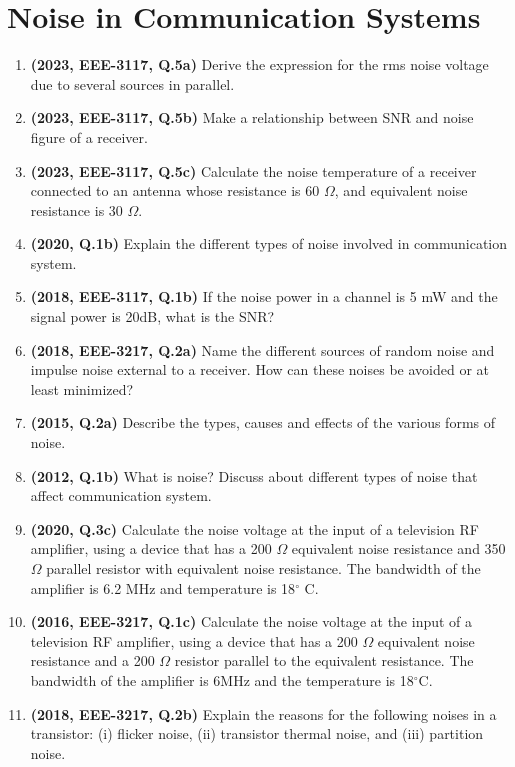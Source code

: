 \documentclass[12pt, a4paper]{article}
\begin{document}
	\section{Noise in Communication Systems}
	\begin{enumerate}
		\item \textbf{(2023, EEE-3117, Q.5a)} Derive the expression for the rms noise voltage due to several sources in parallel.
		\item \textbf{(2023, EEE-3117, Q.5b)} Make a relationship between SNR and noise figure of a receiver.
		\item \textbf{(2023, EEE-3117, Q.5c)} Calculate the noise temperature of a receiver connected to an antenna whose resistance is 60 $\Omega$, and equivalent noise resistance is 30 $\Omega$.
		\item \textbf{(2020, Q.1b)} Explain the different types of noise involved in communication system.
		\item \textbf{(2018, EEE-3117, Q.1b)} If the noise power in a channel is 5 mW and the signal power is 20dB, what is the SNR?
		\item \textbf{(2018, EEE-3217, Q.2a)} Name the different sources of random noise and impulse noise external to a receiver. How can these noises be avoided or at least minimized?
		\item \textbf{(2015, Q.2a)} Describe the types, causes and effects of the various forms of noise.
		\item \textbf{(2012, Q.1b)} What is noise? Discuss about different types of noise that affect communication system.
		
		\item \textbf{(2020, Q.3c)} Calculate the noise voltage at the input of a television RF amplifier, using a device that has a 200 $\Omega$ equivalent noise resistance and 350$\Omega$ parallel resistor with equivalent noise resistance. The bandwidth of the amplifier is 6.2 MHz and temperature is 18$^{\circ}$ C.
		\item \textbf{(2016, EEE-3217, Q.1c)} Calculate the noise voltage at the input of a television RF amplifier, using a device that has a 200 $\Omega$ equivalent noise resistance and a 200 $\Omega$ resistor parallel to the equivalent resistance. The bandwidth of the amplifier is 6MHz and the temperature is 18$^{\circ}$C.
		
		\item \textbf{(2018, EEE-3217, Q.2b)} Explain the reasons for the following noises in a transistor: (i) flicker noise, (ii) transistor thermal noise, and (iii) partition noise.
		

\end{enumerate}
\end{document}
